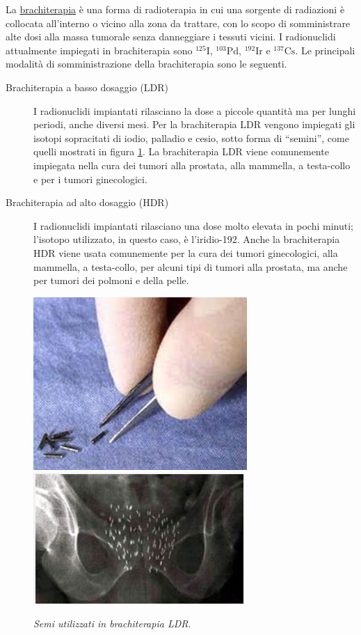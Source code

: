 \documentclass{report}
\newcommand{\virgolette}[1]{``#1''}
\newcommand{\figref}[1]{figura \ref{#1}}
\numberwithin{equation}{section}
\numberwithin{figure}{section}
\begin{document}
La \underline{brachiterapia} è una forma di radioterapia in cui una sorgente di radiazioni è collocata all'interno o vicino alla zona da trattare, con lo scopo di somministrare alte dosi alla massa tumorale senza danneggiare i tessuti vicini. I radionuclidi attualmente impiegati in brachiterapia sono $\mathrm{^{125}I}$, $\mathrm{^{103}Pd}$, $\mathrm{^{192}Ir}$ e $\mathrm{^{137}Cs}$. Le principali modalità di somministrazione della brachiterapia sono le seguenti.
\begin{description}
    \item[Brachiterapia a basso dosaggio (LDR)] I radionuclidi impiantati rilasciano la dose a piccole quantità ma per lunghi periodi, anche diversi mesi. Per la brachiterapia LDR vengono impiegati gli isotopi sopracitati di iodio, palladio e cesio, sotto forma di \virgolette{semini}, come quelli mostrati in \figref{fig:semi}. La brachiterapia LDR viene comunemente impiegata nella cura dei tumori alla prostata, alla mammella, a testa-collo e per i tumori ginecologici.
    \item[Brachiterapia ad alto dosaggio (HDR)] I radionuclidi impiantati rilasciano una dose molto elevata in pochi minuti; l'isotopo utilizzato, in questo caso, è l'iridio-192. Anche la brachiterapia HDR viene usata comunemente per la cura dei tumori ginecologici, alla mammella, a testa-collo, per alcuni tipi di tumori alla prostata, ma anche per tumori dei polmoni e della pelle.
\end{description}

\begin{figure}[htp]
\centering
\includegraphics[scale=0.985]{immagini/semi.png}\quad\includegraphics[scale=1.3]{immagini/semi2.png}
\caption{\label{fig:semi} \textit{Semi utilizzati in brachiterapia LDR}.}
\end{figure}
\end{document}
